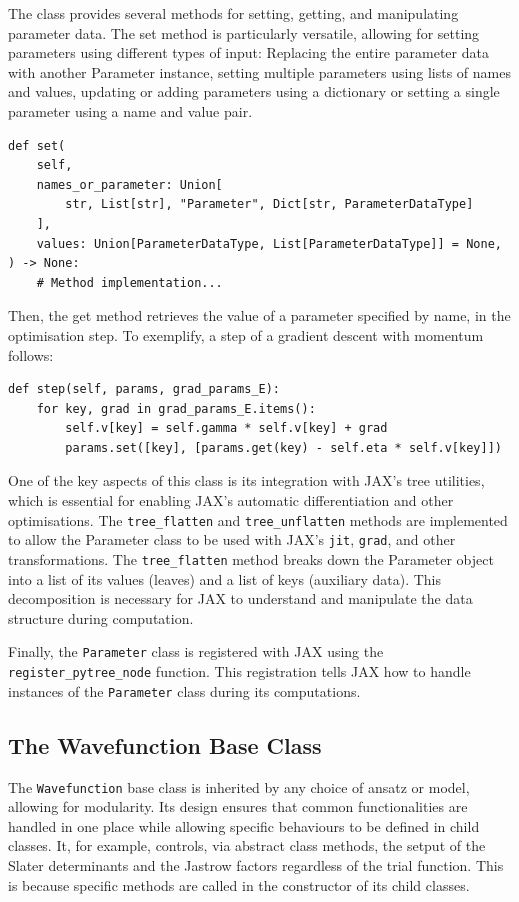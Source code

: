 The class provides several methods for setting, getting, and manipulating parameter data. The set method is particularly versatile, allowing for setting parameters using different types of input: Replacing the entire parameter data with another Parameter instance, setting multiple parameters using lists of names and values, updating or adding parameters using a dictionary or setting a single parameter using a name and value pair.
\begin{lstlisting}
def set(
    self,
    names_or_parameter: Union[
        str, List[str], "Parameter", Dict[str, ParameterDataType]
    ],
    values: Union[ParameterDataType, List[ParameterDataType]] = None,
) -> None:
    # Method implementation...
\end{lstlisting}

Then, the get method retrieves the value of a parameter specified by name, in the optimisation step. To exemplify, a step of a gradient descent with momentum follows:
\begin{lstlisting}
def step(self, params, grad_params_E):
    for key, grad in grad_params_E.items():
        self.v[key] = self.gamma * self.v[key] + grad
        params.set([key], [params.get(key) - self.eta * self.v[key]])
\end{lstlisting}

One of the key aspects of this class is its integration with JAX's tree utilities, which is essential for enabling JAX's automatic differentiation and other optimisations. The \verb|tree_flatten| and \verb|tree_unflatten| methods are implemented to allow the Parameter class to be used with JAX's \verb|jit|, \verb|grad|, and other transformations. The \verb|tree_flatten| method breaks down the Parameter object into a list of its values (leaves) and a list of keys (auxiliary data). This decomposition is necessary for JAX to understand and manipulate the data structure during computation.

Finally, the \verb|Parameter| class is registered with JAX using the \verb|register_pytree_node| function. This registration tells JAX how to handle instances of the \verb|Parameter| class during its computations.

\subsection{The Wavefunction Base Class}

The \verb|Wavefunction| base class is inherited by any choice of ansatz or model, allowing for modularity. Its design ensures that common functionalities are handled in one place while allowing specific behaviours to be defined in child classes. It, for example, controls, via abstract class methods, the setput of the Slater determinants and the Jastrow factors regardless of the trial function. This is because specific methods are called in the constructor of its child classes.

